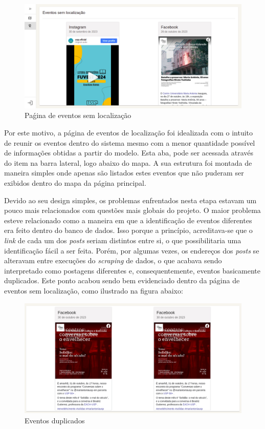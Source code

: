 \begin{figure}[h]
    \centering
    \includegraphics[width=1\textwidth]{figuras/locationlessPage.png}
    \caption{Paǵina de eventos sem localização}
    \label{fig:enter-label}
\end{figure}

Por este motivo, a página de eventos de localização foi idealizada com o
intuito de reunir os eventos dentro do sistema mesmo com a menor quantidade
possível de informações obtidas a partir do modelo. Esta aba, pode ser acessada
através do item na barra lateral, logo abaixo do mapa. A sua estrutura foi
montada de maneira simples onde apenas são listados estes eventos que não
puderam ser exibidos dentro do mapa da página principal.

Devido ao seu design simples, os problemas enfrentados nesta etapa estavam um
pouco mais relacionados com questões mais globais do projeto. O maior problema
esteve relacionado como a maneira em que a identificação de eventos diferentes
era feito dentro do banco de dados. Isso porque a princípio, acreditava-se que
o \textit{link} de cada um dos \textit{posts} seriam distintos entre si, o que
possibilitaria uma identificação fácil a ser feita. Porém, por algumas vezes,
os endereços dos \textit{posts} se alteravam entre execuções do
\textit{scraping} de dados, o que acabava sendo interpretado como postagens
diferentes e, consequentemente, eventos basicamente duplicados. Este ponto
acabou sendo bem evidenciado dentro da página de eventos sem localização, como
ilustrado na figura abaixo:

\begin{figure}[h]
    \centering
    \includegraphics[width=1\textwidth]{figuras/duplicatedEvents.png}
    \caption{Eventos duplicados}
    \label{fig:enter-label}
\end{figure}


